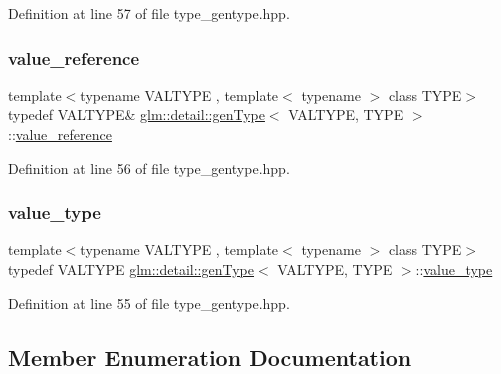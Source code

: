 Definition at line 57 of file type\+\_\+gentype.\+hpp.

\mbox{\label{structglm_1_1detail_1_1gen_type_a557d18598a777df9f16fa1bd7c637ca4}} 
\subsubsection{\texorpdfstring{value\+\_\+reference}{value\_reference}}
{\footnotesize\ttfamily template$<$typename V\+A\+L\+T\+Y\+PE , template$<$ typename $>$ class T\+Y\+PE$>$ \\
typedef V\+A\+L\+T\+Y\+PE\& \hyperlink{structglm_1_1detail_1_1gen_type}{glm\+::detail\+::gen\+Type}$<$ V\+A\+L\+T\+Y\+PE, T\+Y\+PE $>$\+::\hyperlink{structglm_1_1detail_1_1gen_type_a557d18598a777df9f16fa1bd7c637ca4}{value\+\_\+reference}}



Definition at line 56 of file type\+\_\+gentype.\+hpp.

\mbox{\label{structglm_1_1detail_1_1gen_type_ad59e126a45bca74a36732a30cdaee520}} 
\subsubsection{\texorpdfstring{value\+\_\+type}{value\_type}}
{\footnotesize\ttfamily template$<$typename V\+A\+L\+T\+Y\+PE , template$<$ typename $>$ class T\+Y\+PE$>$ \\
typedef V\+A\+L\+T\+Y\+PE \hyperlink{structglm_1_1detail_1_1gen_type}{glm\+::detail\+::gen\+Type}$<$ V\+A\+L\+T\+Y\+PE, T\+Y\+PE $>$\+::\hyperlink{structglm_1_1detail_1_1gen_type_ad59e126a45bca74a36732a30cdaee520}{value\+\_\+type}}



Definition at line 55 of file type\+\_\+gentype.\+hpp.



\subsection{Member Enumeration Documentation}
\mbox{\label{structglm_1_1detail_1_1gen_type_a67fe8a1e8d43ab9e9151868ed277be94}} 

